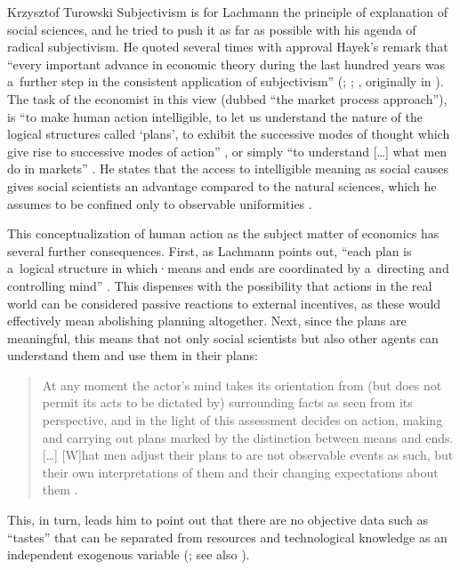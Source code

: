 \begin{artengenv}{Krzysztof Turowski}
Subjectivism is for Lachmann the principle of explanation of social sciences, and he tried to push it as far as possible with his agenda of radical subjectivism.
He quoted several times with approval Hayek's remark that ``every important advance in economic theory during the last hundred years was a~further step in the consistent application of subjectivism'' (\cite[155]{lachmann-individualism}; \citeyear[23]{lachmann1986market}; \citeyear[3]{lachmann-shackle-place}, originally in \cite[31]{hayek-counterrevolution}).
The task of the economist in this view (dubbed ``the market process approach''), is ``to make human action intelligible, to let us understand the nature of the logical structures called `plans', to exhibit the successive modes of thought which give rise to successive modes of action'' \parencite[417]{lachmann-ha}, or simply ``to understand [\ldots] what men do in markets'' \parencite[3]{lachmann1986market}.
He states that the access to intelligible meaning as social causes gives social scientists an advantage compared to the natural sciences, which he assumes to be confined only to observable uniformities \parencite[90]{lachmann-shackle-time}.

This conceptualization of human action as the subject matter of economics has several further consequences. First, as Lachmann points out, ``each plan is a~logical structure in which·means and ends are coordinated by a~directing and controlling mind'' \parencite[418]{lachmann-ha}.
This dispenses with the possibility that actions in the real world can be considered passive reactions to external incentives, as these would effectively mean abolishing planning altogether.
Next, since the plans are meaningful, this means that not only social scientists but also other agents can understand them and use them in their plans:
\begin{quote}
At any moment the actor's mind takes its orientation from (but does not permit its acts to be dictated by) surrounding facts as seen from its perspective, and in the light of this assessment decides on action, making and carrying out plans marked by the distinction between means and ends. [\ldots] [W]hat men adjust their plans to are not observable events as such, but their own interpretations of them and their changing expectations about them \parencite[4]{lachmann1986market}.
\end{quote}
This, in turn, leads him to point out that there are no objective data such as ``tastes'' that can be separated from resources and technological knowledge as an independent exogenous variable (\cite[24]{lachmann1986market}; see also \cite[35]{lachmann-crisis}).


\end{artengenv}
